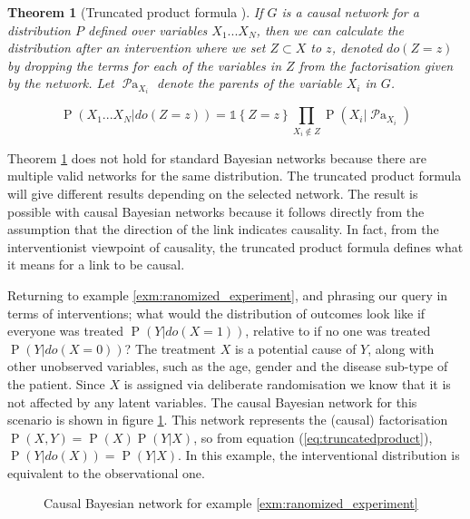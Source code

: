 \documentclass[11pt,a4paper,oneside]{book}
\newcommand{\set}[1]{\left\{#1\right\}}
\newcommand{\ind}[1]{\mathds{1}\!\!\set{#1}}
\renewcommand{\P}[1]{\operatorname{P}\left(#1\right)}
\newcommand{\parents}[1]{\operatorname{\mathcal{P}a}_{#1}}
\theoremstyle{plain}
\newtheorem{theorem}{Theorem}
\theoremstyle{definition}
\begin{document}
\vspace{0.5cm}
\begin{theorem}[Truncated product formula \citep{Pearl2000}]
\label{thm:truncated_prodcut}
If $G$ is a causal network for a distribution $P$ defined over variables $X_{1}...X_{N}$, then we can calculate the distribution after an intervention where we set $Z \subset X$ to $z$, denoted $do(Z=z)$ by dropping the terms for each of the variables in $Z$ from the factorisation given by the network. Let $\parents{X_i}$ denote the parents of the variable $X_i$ in $G$.

\begin{equation}
\label{eq:truncatedproduct}
\P{X_1...X_N|do(Z=z)} = \ind{Z = z}
  \prod_{X_i \notin Z}\P{X_{i}|\parents{X_i}}
\end{equation}
\end{theorem}


Theorem \ref{thm:truncated_prodcut} does not hold for standard Bayesian networks because there are multiple valid networks for the same distribution. The truncated product formula will give different results depending on the selected network. The result is possible with causal Bayesian networks because it follows directly from the assumption that the direction of the link indicates causality. In fact, from the interventionist viewpoint of causality, the truncated product formula defines what it means for a link to be causal. 


Returning to example \ref{exm:ranomized_experiment}, and phrasing our query in terms of interventions; what would the distribution of outcomes look like if everyone was treated $\P{Y|do(X=1)}$, relative to if no one was treated $\P{Y|do(X=0)}$? The treatment $X$ is a potential cause of $Y$, along with other unobserved variables, such as the age, gender and the disease sub-type of the patient. Since $X$ is assigned via deliberate randomisation we know that it is not affected by any latent variables. The causal Bayesian network for this scenario is shown in figure \ref{fig:causal_network_example}. This network represents the (causal) factorisation  $\P{X,Y} = \P{X}\P{Y|X}$, so from equation (\ref{eq:truncatedproduct}), $\P{Y|do(X)} = \P{Y|X}$. In this example, the interventional distribution is equivalent to the observational one.

\begin{figure}[h]
\centering
{}
\caption{Causal Bayesian network for example \ref{exm:ranomized_experiment}}
\label{fig:causal_network_example}
\end{figure}
\end{document}
